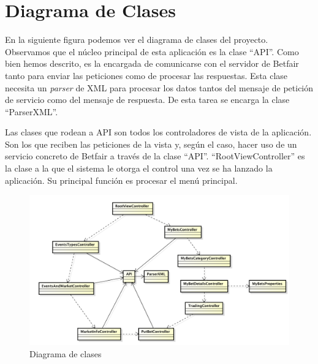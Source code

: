 \section{Diagrama de Clases}
 En la siguiente figura podemos ver el diagrama de clases del proyecto. Observamos que el núcleo principal de esta aplicación es la clase ``API''. Como bien hemos descrito, es la encargada de comunicarse con el servidor de Betfair tanto para enviar las peticiones como de procesar las respuestas. Esta clase necesita un \emph{parser} de XML para procesar los datos tantos del mensaje de petición de servicio como del mensaje de respuesta. De esta tarea se encarga la clase ``ParserXML''.
 
  Las clases que rodean a API son todos los controladores de vista de la aplicación. Son los que reciben las peticiones de la vista y, según el caso, hacer uso de un servicio concreto de Betfair a través de la clase ``API''. ``RootViewController'' es la clase a la que el sistema le otorga el control una vez se ha lanzado la aplicación. Su principal función es procesar el menú principal.

 \begin{figure}[h!]
    \centering
       \includegraphics[width=1.2\textwidth]{./images/class_diagram.png}
     \caption{Diagrama de clases}
   \label{fig:Diagrama de clases}
\end{figure}

